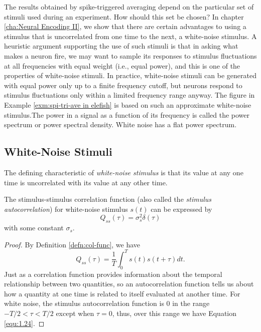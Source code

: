 \begin{rem}
  The results obtained by spike-triggered averaging depend on the particular set of stimuli used during an experiment. How should this set be chosen? In chapter \ref{cha:Neural Encoding II}, we show that there are certain advantages to using a stimulus that is uncorrelated from one time to the next, a white-noise stimulus. A heuristic argument supporting the use of such stimuli is that in asking what makes a neuron fire, we may want to sample its responses to stimulus fluctuations at all frequencies with equal weight (i.e., equal power), and this is one of the properties of white-noise stimuli. In practice, white-noise stimuli can be generated with equal power only up to a finite frequency cutoff, but neurons respond to stimulus fluctuations only within a limited frequency range anyway. 
The figure in Example \ref{exm:spi-tri-ave in elefish} is based on such an approximate white-noise stimulus.The power in a signal as a function of its frequency is called the power spectrum or power spectral density. White noise has a flat power spectrum.
\end{rem}

\subsection{White-Noise Stimuli}
\label{sec:white-noiseStimuli}

\begin{defn}
  \label{defn:whi-noi sti}
  The defining characteristic of \emph{white-noise stimulus} is that its value at any one time is uncorrelated with its value at any other time.
\end{defn}

\begin{prop}
  \label{prop:whiteNoiseAutocorrelation}
  The stimulus-stimulus correlation function (also called the \emph{stimulus autocorrelation}) for white-noise stimulus $s(t)$ can be expressed by
  \begin{equation}
    \label{equ:1.24}
    Q_{ss}(\tau) = \sigma_s^2\delta(\tau)
  \end{equation}
  with some constant $\sigma_s$.
\end{prop}
\begin{proof}
  By Definition \ref{defn:col-func}, we have
  \begin{equation}
    \label{equ:1.23}
    Q_{ss}(\tau) = \frac{1}{T} \int_0^T s(t)s(t+\tau) dt.
  \end{equation}
  Just as a correlation function provides information about the temporal relationship between two quantities, so an autocorrelation function tells us
about how a quantity at one time is related to itself evaluated at another
time. For white noise, the stimulus autocorrelation function is 0 in the
range $-T/2 < \tau < T/2$ except when $\tau=0$, thus, over this range we have Equation \ref{equ:1.24}.
\end{proof}

